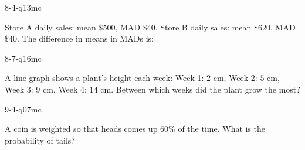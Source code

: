 \begin{practiceQuestion}{8-4-q13}{mc}
\begin{questionText}
Store A daily sales: mean $\$500$, MAD $\$40$. Store B daily sales: mean $\$620$, MAD $\$40$. The difference in means in MADs is:
\end{questionText}
\end{practiceQuestion}

\begin{practiceQuestion}{8-7-q16}{mc}
\begin{questionText}
A line graph shows a plant's height each week: Week 1: $2$ cm, Week 2: $5$ cm, Week 3: $9$ cm, Week 4: $14$ cm. Between which weeks did the plant grow the most?
\end{questionText}
\end{practiceQuestion}

\begin{practiceQuestion}{9-4-q07}{mc}
\begin{questionText}
A coin is weighted so that heads comes up $60\%$ of the time. What is the probability of tails?
\end{questionText}
\end{practiceQuestion}

